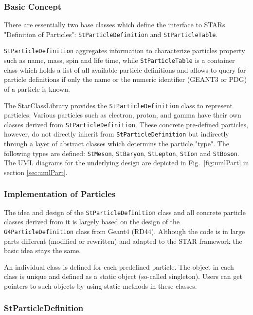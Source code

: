 \documentclass[twoside]{article}
\newcommand{\comp}[1]{\texttt{#1}}%
\begin{document}
\begin{description}
\subsubsection{Basic Concept}

There are essentially two base classes which  define the interface
to STARs "Definition of Particles": \comp{StParticleDefinition} and
\comp{StParticleTable}.

\comp{StParticleDefinition} aggregates information to characterize
particles property such as name, mass, spin and life time, while
\comp{StParticleTable} is a container class which holds a list of all
available particle definitions and allows to query for particle definitions
if only the name or the numeric identifier (GEANT3 or PDG) of a particle is known.
 
The StarClassLibrary provides the \comp{StParticleDefinition} class to
represent particles. Various particles such as electron, proton, and
gamma have their own classes derived from \comp{StParticleDefinition}. 
These concrete pre-defined particles, however, do not directly inherit
from \comp{StParticleDefinition} but indirectly through a layer of abstract
classes which determins the particle "type".  The following types are defined:
\comp{StMeson}, \comp{StBaryon}, \comp{StLepton}, \comp{StIon} and \comp{StBoson}.
The UML diagrams for the underlying design are depicted in Fig.~\ref{fig:umlPart}
in section \ref{sec:umlPart}.

\subsubsection{Implementation of Particles}

The idea and design of the \comp{StParticleDefinition} class and all
concrete particle classes derived from it is largely based on the
design of the \comp{G4ParticleDefinition} class from Geant4
(RD44).  Although the code is in large parts different
(modified or rewritten) and adapted to the STAR framework the basic
idea stays the same.

An individual class is defined for each predefined particle. The
object in each class is unique and defined as a static object (so-called
singleton).  Users can get pointers to such objects by using static
methods in these classes.

\subsubsection{StParticleDefinition}


\end{description}
\end{document}
